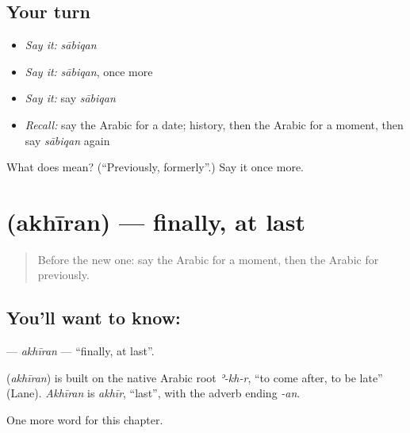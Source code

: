 \subsection*{Your turn}
\begin{itemize}
\raggedright
  \item \emph{Say it:} \emph{sābiqan}
  \item \emph{Say it:} \emph{sābiqan}, once more
  \item \emph{Say it:} say \emph{sābiqan}
  \item \emph{Recall:} say the Arabic for a date; history, then the Arabic for a moment, then say \emph{sābiqan} again
\end{itemize}

\begin{tcolorbox}[breakable,colback=teal!4,colframe=teal!35!black,title={Before you move on}]
What does  mean? (\textquotedblleft{}Previously, formerly\textquotedblright{}.) Say it once more.
\end{tcolorbox}
\section[\texorpdfstring{\ar{أخيرا} (akhīran)}{أخيرا (akhīran)}]{ (akhīran) — finally, at last}

\label{lesson:AR-C203-akhiran}



\begin{quote}
Before the new one: say the Arabic for a moment, then the Arabic for previously.
\end{quote}

\subsection*{You'll want to know: }
\textbf{} — \emph{akhīran} — \textquotedblleft{}finally, at last\textquotedblright{}.

\begin{cousinweb}
\textbf{} (\emph{akhīran}) is built on the native Arabic root \emph{ʾ-kh-r}, \textquotedblleft{}to come after, to be late\textquotedblright{} (Lane). \emph{Akhīran} is \emph{akhīr}, \textquotedblleft{}last\textquotedblright{}, with the adverb ending \emph{-an}.
\end{cousinweb}

\begin{grammarlens}[title={What you've built}]
One more word for this chapter.
\end{grammarlens}

